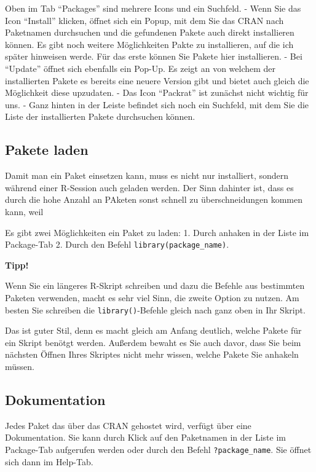 \documentclass[
]{book}
\begin{document}
Oben im Tab ``Packages'' sind mehrere Icons und ein Suchfeld.
- Wenn Sie das Icon ``Install'' klicken, öffnet sich ein Popup, mit dem Sie das CRAN nach Paketnamen durchsuchen und die gefundenen Pakete auch direkt installieren können. Es gibt noch weitere Möglichkeiten Pakte zu installieren, auf die ich später hinweisen werde. Für das erste können Sie Pakete hier installieren.
- Bei ``Update'' öffnet sich ebenfalls ein Pop-Up. Es zeigt an von welchem der installierten Pakete es bereits eine neuere Version gibt und bietet auch gleich die Möglichkeit diese upzudaten.
- Das Icon ``Packrat'' ist zunächst nicht wichtig für uns.
- Ganz hinten in der Leiste befindet sich noch ein Suchfeld, mit dem Sie die Liste der installierten Pakete durchsuchen können.

\hypertarget{pakete-laden}{%
\subsection{Pakete laden}\label{pakete-laden}}

Damit man ein Paket einsetzen kann, muss es nicht nur installiert, sondern während einer R-Session auch geladen werden. Der Sinn dahinter ist, dass es durch die hohe Anzahl an PAketen sonst schnell zu überschneidungen kommen kann, weil

Es gibt zwei Möglichkeiten ein Paket zu laden:
1. Durch anhaken in der Liste im Package-Tab
2. Durch den Befehl \texttt{library(package\_name)}.

\textbf{Tipp!}

Wenn Sie ein längeres R-Skript schreiben und dazu die Befehle aus bestimmten Paketen verwenden, macht es sehr viel Sinn, die zweite Option zu nutzen. Am besten Sie schreiben die \texttt{library()}-Befehle gleich nach ganz oben in Ihr Skript.

Das ist guter Stil, denn es macht gleich am Anfang deutlich, welche Pakete für ein Skript benötgt werden. Außerdem bewaht es Sie auch davor, dass Sie beim nächsten Öffnen Ihres Skriptes nicht mehr wissen, welche Pakete Sie anhakeln müssen.

\hypertarget{dokumentation}{%
\subsection{Dokumentation}\label{dokumentation}}

Jedes Paket das über das CRAN gehostet wird, verfügt über eine Dokumentation. Sie kann durch Klick auf den Paketnamen in der Liste im Package-Tab aufgerufen werden oder durch den Befehl \texttt{?package\_name}. Sie öffnet sich dann im Help-Tab.
\end{document}
